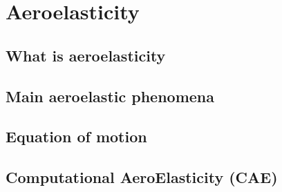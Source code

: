 \chapter{Aeroelasticity}
\label{cha:ael}

\chabstract{}

\minitoc
\newpage

\section{What is aeroelasticity}
\label{sec:what_is_ael}


\section{Main aeroelastic phenomena}
\label{sec:ael_phenomena}


\section{Equation of motion}
\label{sec:ael_equation}


\section{Computational AeroElasticity (CAE)}
\label{sec:ael_cae}


\chconclu{}
